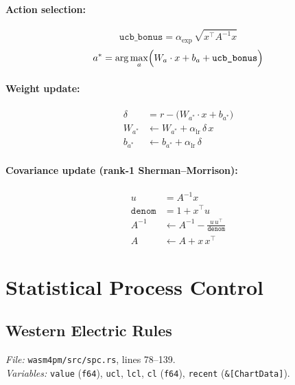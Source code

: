 \documentclass[11pt,a4paper]{article}
\begin{document}
\paragraph{Action selection:}
\begin{equation}
  \texttt{ucb\_bonus} = \alpha_\text{exp}\,\sqrt{x^\top A^{-1} x}
\end{equation}
\begin{equation}
  a^* = \arg\max_a \Bigl(W_a \cdot x + b_a + \texttt{ucb\_bonus}\Bigr)
\end{equation}

\paragraph{Weight update:}
\begin{align}
  \delta &= r - \bigl(W_{a^*}\cdot x + b_{a^*}\bigr) \\
  W_{a^*} &\leftarrow W_{a^*} + \alpha_\text{lr}\,\delta\, x \\
  b_{a^*} &\leftarrow b_{a^*} + \alpha_\text{lr}\,\delta
\end{align}

\paragraph{Covariance update (rank-1 Sherman--Morrison):}
\begin{align}
  u &= A^{-1} x \\
  \texttt{denom} &= 1 + x^\top u \\
  A^{-1} &\leftarrow A^{-1} - \frac{u\, u^\top}{\texttt{denom}} \\
  A &\leftarrow A + x\, x^\top
\end{align}

\section{Statistical Process Control}

\subsection{Western Electric Rules}
\textit{File:} \texttt{wasm4pm/src/spc.rs}, lines 78--139.\\
\textit{Variables:} \texttt{value} (\texttt{f64}), \texttt{ucl}, \texttt{lcl}, \texttt{cl} (\texttt{f64}), \texttt{recent} (\texttt{\&[ChartData]}).
\end{document}
